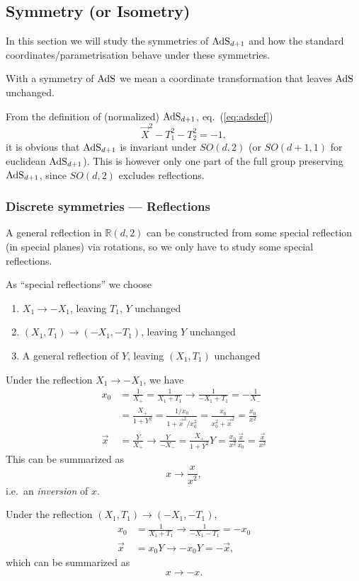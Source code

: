 \subsection{Symmetry (or Isometry)}

In this section we will study the symmetries of $\mathrm{AdS}_{d+1}$ and how the standard coordinates/parametrisation behave under these symmetries.

With a symmetry of $\mathrm{AdS}$ we mean a coordinate transformation that leaves $\mathrm{AdS}$ unchanged.

From the definition of (normalized) $\mathrm{AdS}_{d+1}$, eq.~(\ref{eq:adsdef})
$$\vec{X}^2-T_1^2-T_2^2=-1,$$
it is obvious that $\mathrm{AdS}_{d+1}$ is invariant under $SO(d,2)$ (or $SO(d+1,1)$ for euclidean $\mathrm{AdS}_{d+1}$). This is however only one part of the full group preserving $\mathrm{AdS}_{d+1}$, since $SO(d,2)$ excludes reflections.

\subsubsection{Discrete symmetries --- Reflections}
A general reflection in $\mathbb{R}(d,2)$ can be constructed from some special reflection (in special planes) via rotations, so we only have to study some special reflections.

As ``special reflections'' we choose
\begin{enumerate}
\item $X_1 \rightarrow -X_1$, leaving $T_1$, $Y$ unchanged
\item $(X_1, T_1) \rightarrow (-X_1, -T_1)$, leaving $Y$ unchanged
\item A general reflection of $Y$, leaving $(X_1, T_1)$ unchanged
\end{enumerate}

Under the reflection $X_1 \rightarrow -X_1$, we have
\begin{align}
x_0 &= \frac{1}{X_+} = \frac{1}{X_1+T_1} \rightarrow \frac{1}{-X_1+T_1} = -\frac{1}{X_-} \nonumber \\
&= \frac{X_+}{1+Y^2} = \frac{1/x_0}{1+\vec{x}^2/x_0^2} = \frac{x_0}{x_0^2+\vec{x}^2} = \frac{x_0}{x^2}\\
\vec{x} &= \frac{Y}{X_+} \rightarrow \frac{Y}{-X_-} = \frac{X_+}{1+Y^2} Y = \frac{x_0}{x^2} \frac{\vec{x}}{x_0} = \frac{\vec{x}}{x^2}
\end{align}
This can be summarized as
$$x \rightarrow \frac{x}{x^2},$$
i.e.\ an \emph{inversion} of $x$.

Under the reflection $(X_1, T_1) \rightarrow (-X_1, -T_1)$,
\begin{align}
x_0 &= \frac{1}{X_1+T_1} \rightarrow \frac{1}{-X_1-T_1} = -x_0\\
\vec{x} &= x_0 Y \rightarrow -x_0 Y = -\vec{x},
\end{align}
which can be summarized as
$$x \rightarrow -x.$$

